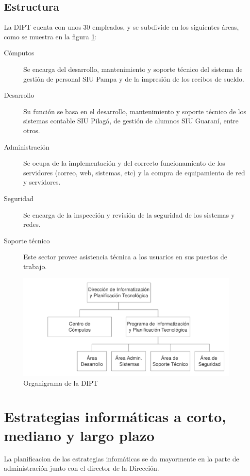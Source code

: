 \documentclass[a4paper,11pt,oneside]{article}
\begin{document}
\subsection{Estructura}
%
La DIPT cuenta con unos 30 empleados, y se subdivide en los siguientes
áreas, como se muestra en la figura \ref{organi-dipt}:
\begin{description}
\item[Cómputos]
  Se encarga del desarrollo, mantenimiento y soporte técnico del
  sistema de gestión de personal SIU Pampa y de la impresión de los
  recibos de sueldo.
%
\item[Desarrollo]
  Su función se basa en el desarrollo, mantenimiento y soporte técnico
  de los sistemas contable SIU Pilagá, de gestión de alumnos SIU
  Guaraní, entre otros.
%
\item[Administración]
  Se ocupa de la implementación y del correcto funcionamiento de los
  servidores (correo, web, sistemas, etc) y la compra de equipamiento
  de red y servidores.
%
\item[Seguridad]
  Se encarga de la inspección y revisión de la seguridad de los
  sistemas y redes.
%
\item[Soporte técnico]
  Este sector provee asistencia técnica a los usuarios en sus puestos
  de trabajo.
\end{description}
%
\begin{figure}[H]
  \center\includegraphics[width=127mm]{img/organi_dipt}
  \caption{Organigrama de la DIPT}
  \label{organi-dipt}
\end{figure}
%
\newpage
\section{Estrategias informáticas a corto, mediano y largo plazo}
%
La planificacion de las estrategias infomáticas se da mayormente en la
parte de administración junto con el director de la Dirección.
\end{document}
